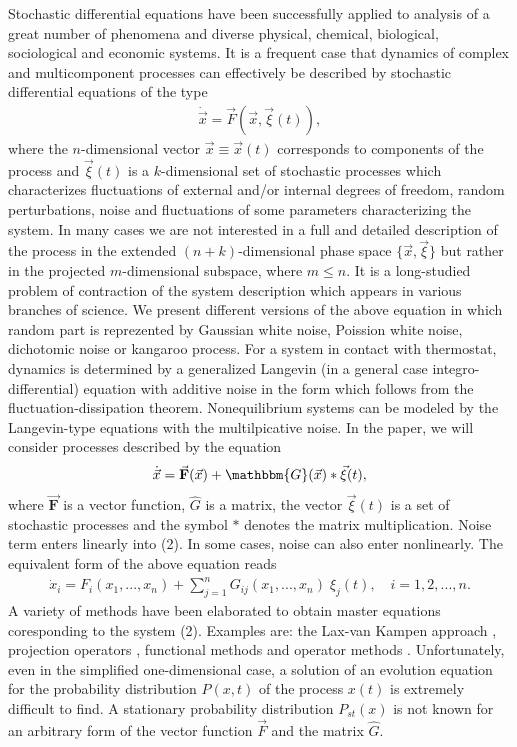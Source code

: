 \documentclass[authoryear,draft,1p,times]{elsarticle}
\renewcommand{\=}{\stackrel{\mathrm{d}}{=}}
\begin{document}
Stochastic differential equations    have been 
successfully  applied to analysis of a great  number of 
phenomena and diverse   physical, chemical, biological, 
sociological and economic systems. 
It is a frequent case that 
dynamics of complex and  multicomponent processes
can  effectively be described
by stochastic differential equations of the  type 
%
\begin{eqnarray}
\label{1}
\dot {\vec x} =  {\vec F}({\vec x}, {\vec \xi} (t)), 
\end{eqnarray}
%
where the $n$-dimensional vector ${\vec x} \equiv {\vec x}(t)$ corresponds
to components of the process and ${\vec \xi} (t)$ is a $k$-dimensional
set of stochastic processes  which 
characterizes fluctuations of
external and/or internal degrees of freedom, random perturbations,  
 noise and fluctuations of some  parameters characterizing the system.
In many cases we are not interested in a full and  detailed 
 description of the process in the
extended $(n+k)$-dimensional phase space $\{{\vec x}, {\vec \xi}\}$
but rather in the projected $m$-dimensional subspace, where $m \le n$. 
It is a long-studied problem
of contraction of the system description
which appears in various branches of science. 
 We  present  different  versions of the above equation in which  random part is 
reprezented by Gaussian white noise, Poission white noise,  dichotomic noise or kangaroo 
process.   For a  system in contact with thermostat, 
dynamics is determined by a generalized Langevin (in a general case integro-differential) 
equation with additive noise in the form which follows from the fluctuation-dissipation theorem.  Nonequilibrium systems can be modeled by the Langevin-type  equations 
with the multilpicative noise.  In the paper, we will consider processes described by  
the equation   
%
\begin{eqnarray}
\label{2}
\dot {\vec x} =  \vec {\mathbf  F}({\vec x}) + \mathbbm{G}({\vec x}) \ast {\vec \xi} (t), 
\end{eqnarray}
%
where  $ \vec {\mathbf  F}$ is a vector function,   $ {\hat G}$ is a  matrix,  the vector ${\vec \xi}(t)$ is a set of  stochastic processes  and the symbol $\ast$ denotes the matrix multiplication. Noise term  enters linearly into (2).  In some cases, noise can also enter nonlinearly. 
The equivalent form of the above equation reads 
%
\begin{eqnarray}
\label{2}
\dot x_i =   F_i(x_1, ..., x_n) + \sum_{j=1}^n G_{ij}(x_1, ...,x_n) \;  \xi_j (t),  
\quad i=1,2,..., n. 
\end{eqnarray}
%
A variety of methods have been elaborated
to obtain  master equations coresponding to the system (2). Examples are:
the Lax-van Kampen approach \cite{lax,van,west},
projection operators \cite{mar}, functional methods \cite{func1,wio,func2} and
operator methods \cite{hake,lucz1,lucz2}. Unfortunately, even in the simplified one-dimensional   case, a solution  of an evolution equation for the probability distribution $P(x,t)$ 
of  the process $x(t)$  is extremely difficult to find. 
A stationary probability distribution $P_{st}(x)$ is not
known for an arbitrary form of the vector function ${\vec F}$ and the matrix ${\hat G}$.
\end{document}
